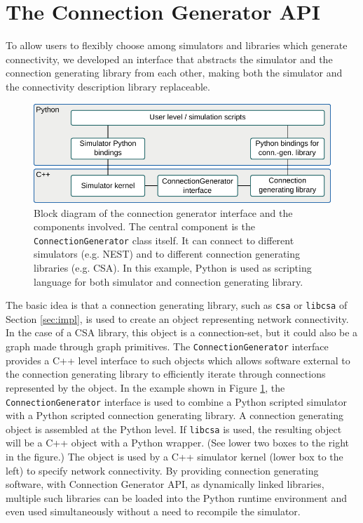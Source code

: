 \documentclass{frontiersSCNS} %
\begin{document}

\section{The Connection Generator API}

To allow users to flexibly choose among simulators and libraries which
generate connectivity, we developed an interface that abstracts the
simulator and the connection generating library from each other,
making both the simulator and the connectivity description library
replaceable.

\begin{figure}[ht]
\centering
\includegraphics[scale=.8]{figures/block_diagram_conngen.pdf}
\caption{Block diagram of the connection generator interface and the
  components involved. The central component is the
  \texttt{ConnectionGenerator} class itself. It can connect to different
  simulators (e.g. NEST) and to different connection generating
  libraries (e.g. CSA). In this example, Python is used as scripting
  language for both simulator and connection generating
  library.}\label{fig:block_diagram_conngen}
\end{figure}

The basic idea is that a connection generating library, such as
\verb|csa| or \verb|libcsa| of Section \ref{sec:impl}, is used to
create an object representing network connectivity.  In the case of a
CSA library, this object is a connection-set, but it could also be a
graph made through graph primitives. The \verb|ConnectionGenerator| interface
provides a C++ level interface to such objects which allows software
external to the connection generating library to efficiently iterate
through connections represented by the object.  In the example shown
in Figure \ref{fig:block_diagram_conngen}, the \verb|ConnectionGenerator|
interface is used to combine a Python scripted simulator with a Python
scripted connection generating library. A connection generating object
is assembled at the Python level.  If \verb|libcsa| is used, the
resulting object will be a C++ object with a Python wrapper. (See
lower two boxes to the right in the figure.) The object is used by a
C++ simulator kernel (lower box to the left) to specify network
connectivity. By providing connection generating software, with
Connection Generator API, as dynamically linked libraries, multiple
such libraries can be loaded into the Python runtime environment and
even used simultaneously without a need to recompile the simulator.
\end{document}
